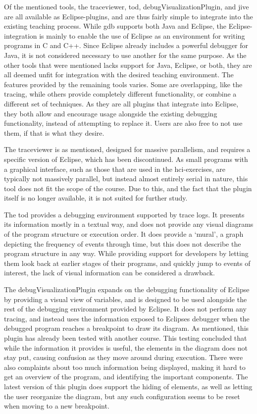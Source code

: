Of the mentioned tools, the \gls{traceviewer}, \gls{tod}, \gls{debugVisualizationPlugin}, and \gls{jive} are all available as Eclipse-plugins, and are thus fairly simple to integrate into the existing teaching process.
While \gls{gdb} supports both Java and Eclipse, the Eclipse-integration is mainly to enable the use of Eclipse as an environment for writing programs in C and C++.
Since Eclipse already includes a powerful debugger for Java, it is not considered necessary to use another for the same purpose.
As the other tools that were mentioned lacks support for Java, Eclipse, or both, they are all deemed unfit for integration with the desired teaching environment.
The features provided by the remaining tools varies.
Some are overlapping, like the tracing, while others provide completely different functionality, or combine a different set of techniques.
As they are all plugins that integrate into Eclipse, they both allow and encourage usage alongside the existing debugging functionality, instead of attempting to replace it.
Users are also free to not use them, if that is what they desire.

The \gls{traceviewer} is as mentioned, designed for massive parallelism, and requires a specific version of Eclipse, which has been discontinued.
As small programs with a graphical interface, such as those that are used in the \gls{hci}-exercises, are typically not massively parallel, but instead almost entirely serial in nature, this tool does not fit the scope of the course.
Due to this, and the fact that the plugin itself is no longer available, it is not suited for further study.

The \gls{tod} provides a debugging environment supported by trace logs.
It presents its information mostly in a textual way, and does not provide any visual diagrams of the program structure or execution order.
It does provide a `mural', a graph depicting the frequency of events through time, but this does not describe the program structure in any way.
While providing support for developers by letting them look back at earlier stages of their programs, and quickly jump to events of interest, the lack of visual information can be considered a drawback.

The \gls{debugVisualizationPlugin} expands on the debugging functionality of Eclipse by providing a visual view of variables, and is designed to be used alongside the rest of the debugging environment provided by Eclipse.
It does not perform any tracing, and instead uses the information exposed to Eclipses debugger when the debugged program reaches a breakpoint to draw its diagram.
As mentioned, this plugin has already been tested with another course.
This testing concluded that while the information it provides is useful, the elements in the diagram does not stay put, causing confusion as they move around during execution.
There were also complaints about too much information being displayed, making it hard to get an overview of the program, and identifying the important components.
The latest version of this plugin does support the hiding of elements, as well as letting the user reorganize the diagram, but any such configuration seems to be reset when moving to a new breakpoint.

